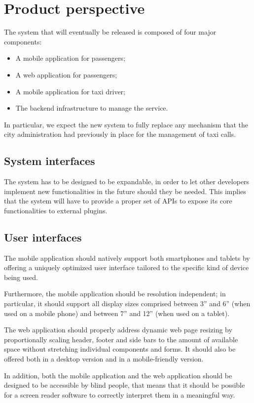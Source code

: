 \section{Product perspective}
The system that will eventually be released is composed of four major components:
\begin{itemize}
\item A mobile application for passengers;
\item A web application for passengers;
\item A mobile application for taxi driver;
\item The backend infrastructure to manage the service.
\end{itemize}
In particular, we expect the new system to fully replace any mechanism that the city administration had previously in place for the management of taxi calls.


\subsection{System interfaces}
The system has to be designed to be expandable, in order to let other developers implement new functionalities in the future should they be needed. This implies that the system will have to provide a proper set of APIs to expose its core functionalities to external plugins. 


\subsection{User interfaces}
The mobile application should natively support both smartphones and tablets by offering a uniquely optimized user interface tailored to the specific kind of device being used. 

Furthermore, the mobile application should be resolution independent; in particular, it should support all display sizes comprised between 3” and 6” (when used on a mobile phone) and between 7” and 12” (when used on a tablet).

The web application should properly address dynamic web page resizing by proportionally scaling header, footer and side bars to the amount of available space without stretching individual components and forms. It should also be offered both in a desktop version and in a mobile-friendly version.

In addition, both the mobile application and the web application should be designed to be accessible by blind people, that means that it should be possible for a screen reader software to correctly interpret them in a meaningful way.


